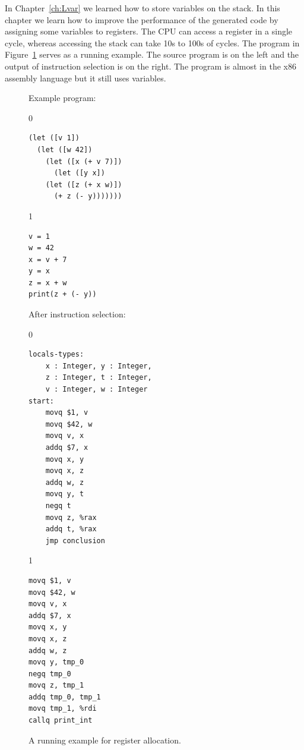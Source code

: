 \documentclass[7x10]{TimesAPriori_MIT}%
\def\racketEd{0}
\def\pythonEd{1}
\def\edition{1}
\begin{document}

In Chapter~\ref{ch:Lvar} we learned how to store variables on the
stack. In this chapter we learn how to improve the performance of the
generated code by assigning some variables to registers.  The CPU can
access a register in a single cycle, whereas accessing the stack can
take 10s to 100s of cycles.  The program in Figure~\ref{fig:reg-eg}
serves as a running example. The source program is on the left and the
output of instruction selection is on the right. The program is almost
in the x86 assembly language but it still uses variables.

\begin{figure}
\begin{minipage}{0.45\textwidth}
Example \LangVar{} program:
{\if\edition\racketEd
\begin{lstlisting}
(let ([v 1])
  (let ([w 42])
    (let ([x (+ v 7)])
      (let ([y x])
	(let ([z (+ x w)])
	  (+ z (- y)))))))
\end{lstlisting}
\fi}
{\if\edition\pythonEd
\begin{lstlisting}
v = 1
w = 42
x = v + 7
y = x
z = x + w
print(z + (- y))
\end{lstlisting}
\fi}
\end{minipage}
\begin{minipage}{0.45\textwidth}
After instruction selection:
{\if\edition\racketEd
\begin{lstlisting}
locals-types:
    x : Integer, y : Integer,
    z : Integer, t : Integer,
    v : Integer, w : Integer
start:
    movq $1, v
    movq $42, w
    movq v, x
    addq $7, x
    movq x, y
    movq x, z
    addq w, z
    movq y, t
    negq t
    movq z, %rax
    addq t, %rax
    jmp conclusion
\end{lstlisting}
\fi}
{\if\edition\pythonEd
\begin{lstlisting}
movq $1, v
movq $42, w
movq v, x
addq $7, x
movq x, y
movq x, z
addq w, z
movq y, tmp_0
negq tmp_0
movq z, tmp_1
addq tmp_0, tmp_1
movq tmp_1, %rdi
callq print_int
\end{lstlisting}
\fi}
\end{minipage}
\caption{A running example for register allocation.}
\label{fig:reg-eg}
\end{figure}
\end{document}
